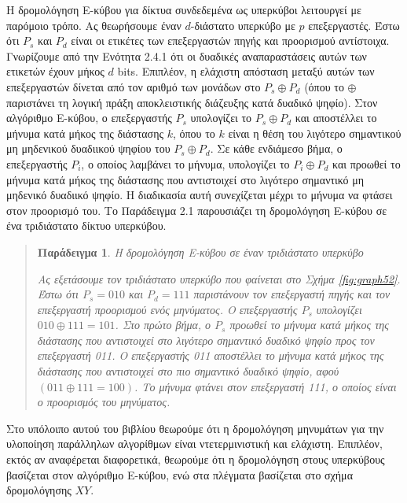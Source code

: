 \documentclass[12pt,a4paper]{article} %
\newtheorem{paradeigma}{Παράδειγμα}
\begin{document}
Η δρομολόγηση Ε-κύβου για δίκτυα συνδεδεμένα ως υπερκύβοι λειτουργεί με 
παρόμοιο τρόπο. Ας θεωρήσουμε έναν $d$-διάστατο υπερκύβο με $p$ επεξεργαστές.
Έστω ότι $P_s$ και $P_d$ είναι οι ετικέτες των επεξεργαστών πηγής
και προορισμού αντίστοιχα. Γνωρίζουμε από την Ενότητα 2.4.1 ότι οι δυαδικές 
αναπαραστάσεις αυτών των ετικετών έχουν μήκος $d$ bits.
Επιπλέον, η ελάχιστη απόσταση μεταξύ αυτών των επεξεργαστών δίνεται από 
τον αριθμό των μονάδων στο $P_s \oplus P_d$ (όπου το $\oplus$ παριστάνει 
τη λογική πράξη αποκλειστικής διάζευξης κατά δυαδικό ψηφίο).
Στον αλγόριθμο Ε-κύβου, ο επεξεργαστής $P_s$ υπολογίζει το $P_s \oplus P_d$
και αποστέλλει το μήνυμα κατά μήκος της διάστασης $k$, όπου το $k$ είναι 
η θέση του λιγότερο σημαντικού μη μηδενικού δυαδιικού ψηφίου του $P_s \oplus P_d$.
Σε κάθε ενδιάμεσο βήμα, ο επεξεργαστής $P_i$, ο οποίος λαμβάνει το μήνυμα,
υπολογίζει το $P_i \oplus P_d$ και προωθεί το μήνυμα κατά μήκος της 
διάστασης που αντιστοιχεί στο λιγότερο σημαντικό μη μηδενικό δυαδιικό ψηφίο.
Η διαδικασία αυτή συνεχίζεται μέχρι το μήνυμα να φτάσει στον προορισμό του.
Το Παράδειγμα 2.1 παρουσιάζει τη δρομολόγηση Ε-κύβου σε ένα τριδιάστατο 
δίκτυο υπερκύβου.

\begin{quote}
\begin{paradeigma} \label{par:3} H δρομολόγηση Ε-κύβου σε έναν τριδιάστατο 
  υπερκύβο

Ας εξετάσουμε τον τριδιάστατο υπερκύβο που φαίνεται στο Σχήμα 
\ref{fig:graph52}. Έστω ότι $P_s = 010$ και $P_d = 111$ παριστάνουν τον 
επεξεργαστή πηγής και τον επεξεργαστή προορισμού ενός μηνύματος. Ο 
επεξεργαστής $P_s$ υπολογίζει $010 \oplus 111 = 101$. Στο πρώτο βήμα, ο 
$P_s$ προωθεί το μήνυμα κατά μήκος της διάστασης που αντιστοιχεί στο 
λιγότερο σημαντικό δυαδικό ψηφίο προς τον επεξεργαστή 011. Ο επεξεργαστής 
011 αποστέλλει το μήνυμα κατά μήκος της διάστασης που αντιστοιχεί στο πιο 
σημαντικό δυαδικό ψηφίο, αφού $(011 \oplus 111 = 100)$. Το μήνυμα φτάνει 
στον επεξεργαστή 111, ο οποίος είναι ο προορισμός του μηνύματος.
\end{paradeigma}
\end{quote}

\begin{sloppypar}
Στο υπόλοιπο αυτού του βιβλίου θεωρούμε ότι η δρομολόγηση μηνυμάτων για 
την υλοποίηση παράλληλων αλγορίθμων είναι ντετερμινιστική και ελάχιστη. 
Επιπλέον, εκτός αν αναφέρεται διαφορετικά, θεωρούμε ότι η δρομολόγηση στους 
υπερκύβους βασίζεται στον αλγόριθμο Ε-κύβου, ενώ στα πλέγματα βασίζεται 
στο σχήμα δρομολόγησης $XY$.
\end{sloppypar}
\end{document}
